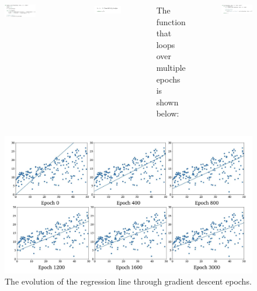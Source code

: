 \documentclass[9pt,dvipsnames]{beamer}
\begin{document}
\begin{frame}
	\begin{columns}
			\begin{figure}
			\centering
			\includegraphics[width=\textwidth]{imgs/ana_ml_2.jpeg}
			\end{figure}
					\begin{figure}
					\centering
					\includegraphics[scale=0.1]{imgs/ana_ml_3.png}
				\end{figure}
				The function that loops over multiple epochs is shown below:
				\begin{figure}
					\centering
					\includegraphics[width=\textwidth]{imgs/ana_ml_4.jpeg}
				\end{figure}
	\end{columns} 
\end{frame}

\begin{frame}
	\begin{figure}
		\centering
		\includegraphics[width=\textwidth]{imgs/ana_ml_5.png}
		\caption{The evolution of the regression line through gradient descent epochs.}
	\end{figure}
\end{frame}
\end{document}
